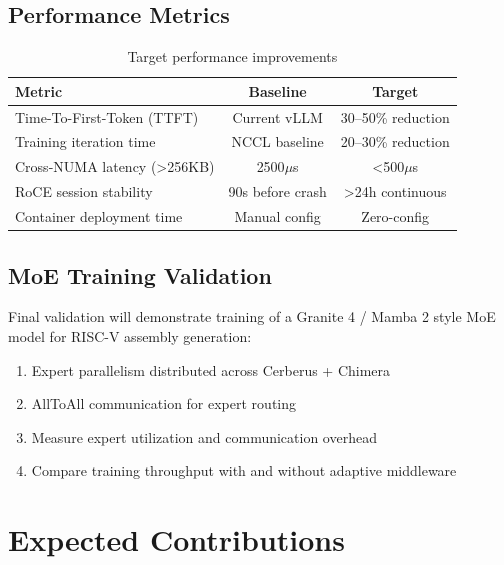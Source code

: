 \documentclass[11pt,letterpaper]{article}
\theoremstyle{definition}
\begin{document}
\subsection{Performance Metrics}

\begin{table}[htbp]
\centering
\caption{Target performance improvements}
\label{tab:metrics}
\begin{tabular}{@{}lcc@{}}
\toprule
\textbf{Metric} & \textbf{Baseline} & \textbf{Target} \\
\midrule
Time-To-First-Token (TTFT) & Current vLLM & 30--50\% reduction \\
Training iteration time & NCCL baseline & 20--30\% reduction \\
Cross-NUMA latency (>256KB) & 2500$\mu$s & <500$\mu$s \\
RoCE session stability & 90s before crash & >24h continuous \\
Container deployment time & Manual config & Zero-config \\
\bottomrule
\end{tabular}
\end{table}

\subsection{MoE Training Validation}

Final validation will demonstrate training of a Granite 4 / Mamba 2 style MoE model for RISC-V assembly generation:

\begin{enumerate}
    \item Expert parallelism distributed across Cerberus + Chimera
    \item AllToAll communication for expert routing
    \item Measure expert utilization and communication overhead
    \item Compare training throughput with and without adaptive middleware
\end{enumerate}

\section{Expected Contributions}
\end{document}
